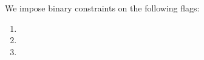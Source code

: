 We impose binary constraints on the following flags:
\begin{multicols}{3}
        \begin{enumerate}
		\item \sysi{}
                \item \user{}
                \item \sysf{}
        \end{enumerate}
\end{multicols}

